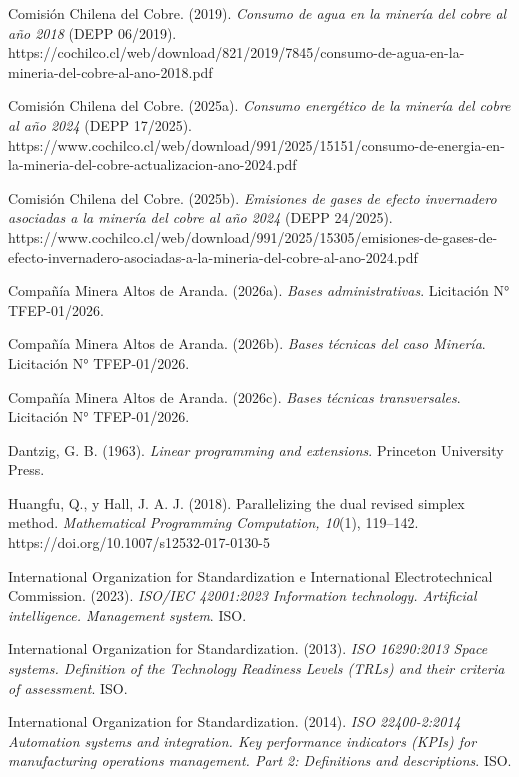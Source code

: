 \documentclass[formulario]{../../comun/overfore}
\begin{document}
\begin{horizontal}
\end{horizontal}

\begin{referencias}
\item Comisión Chilena del Cobre. (2019). \emph{Consumo de agua en la minería del cobre al año 2018} (DEPP 06/2019). https://cochilco.cl/web/download/821/2019/7845/consumo-de-agua-en-la-mineria-del-cobre-al-ano-2018.pdf
\item Comisión Chilena del Cobre. (2025a). \emph{Consumo energético de la minería del cobre al año 2024} (DEPP 17/2025). https://www.cochilco.cl/web/download/991/2025/15151/consumo-de-energia-en-la-mineria-del-cobre-actualizacion-ano-2024.pdf
\item Comisión Chilena del Cobre. (2025b). \emph{Emisiones de gases de efecto invernadero asociadas a la minería del cobre al año 2024} (DEPP 24/2025). https://www.cochilco.cl/web/download/991/2025/15305/emisiones-de-gases-de-efecto-invernadero-asociadas-a-la-mineria-del-cobre-al-ano-2024.pdf
\item Compañía Minera Altos de Aranda. (2026a). \emph{Bases administrativas}. Licitación N° TFEP-01/2026.
\item Compañía Minera Altos de Aranda. (2026b). \emph{Bases técnicas del caso Minería}. Licitación N° TFEP-01/2026.
\item Compañía Minera Altos de Aranda. (2026c). \emph{Bases técnicas transversales}. Licitación N° TFEP-01/2026.
\item Dantzig, G. B. (1963). \emph{Linear programming and extensions}. Princeton University Press.
\item Huangfu, Q., y Hall, J. A. J. (2018). Parallelizing the dual revised simplex method. \emph{Mathematical Programming Computation, 10}(1), 119–142. https://doi.org/10.1007/s12532-017-0130-5
\item International Organization for Standardization e International Electrotechnical Commission. (2023). \emph{ISO/IEC 42001:2023 Information technology. Artificial intelligence. Management system}. ISO.
\item International Organization for Standardization. (2013). \emph{ISO 16290:2013 Space systems. Definition of the Technology Readiness Levels (TRLs) and their criteria of assessment}. ISO.
\item International Organization for Standardization. (2014). \emph{ISO 22400-2:2014 Automation systems and integration. Key performance indicators (KPIs) for manufacturing operations management. Part 2: Definitions and descriptions}. ISO.

\end{referencias}
\end{document}
